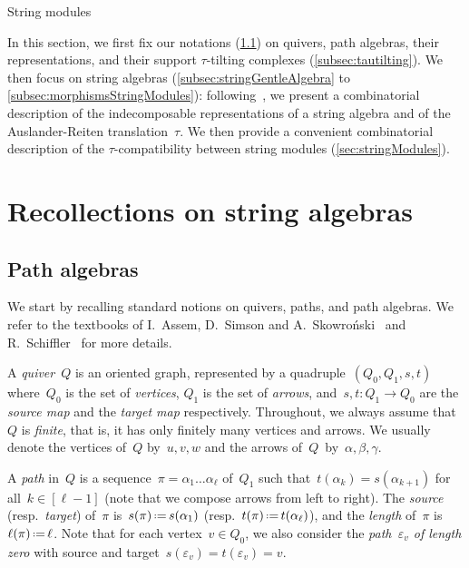 \documentclass{amsart}
\makeatletter
\theoremstyle{definition}
\newcommand{\eqdef}{\mbox{\,\raisebox{0.2ex}{\scriptsize\ensuremath{\mathrm:}}\ensuremath{=}\,}} %
\newcommand{\darkblue}{\color{darkblue}} %
\newcommand{\defn}[1]{\textsl{\darkblue #1}} %
\def\part{\@startsection{part}{1}%
\z@{.7\linespacing\@plus\linespacing}{.8\linespacing}%
{\LARGE\sffamily\centering}}
\makeatother
\begin{document}


\newpage
\part{String modules}
\label{part:algebra}

In this section, we first fix our notations (\ref{subsec:pathAlgebra}) on quivers, path algebras, their representations, and their support $\tau$-tilting complexes (\ref{subsec:tautilting}).
We then focus on string algebras (\ref{subsec:stringGentleAlgebra} to \ref{subsec:morphismsStringModules}): following~\cite{ButlerRingel}, we present a combinatorial description of the indecomposable representations of a string algebra and of the Auslander-Reiten translation~$\tau$.
We then provide a convenient combinatorial description of the $\tau$-compatibility between string modules (\ref{sec:stringModules}).

\section{Recollections on string algebras}
\label{sec:recollectionsStringAlgebras}

\subsection{Path algebras}
\label{subsec:pathAlgebra}

We start by recalling standard notions on quivers, paths, and path algebras.
We refer to the textbooks of I.~Assem, D.~Simson and A.~Skowro\'nski~\cite{AssemSimsonSkowronski} and R.~Schiffler~\cite{Schiffler} for more details.

A \defn{quiver}~$Q$ is an oriented graph, represented by a quadruple~$(Q_0, Q_1, s, t)$ where~$Q_0$ is the set of \defn{vertices}, $Q_1$ is the set of \defn{arrows}, and~$s, t : Q_1 \to Q_0$ are the \defn{source map} and the \defn{target map} respectively.
Throughout, we always assume that~$Q$ is \defn{finite}, that is, it has only finitely many vertices and arrows.
We usually denote the vertices of~$Q$ by~$u,v,w$ and the arrows of~$Q$~by~$\alpha, \beta, \gamma$.

A \defn{path} in~$Q$ is a sequence~$\pi = \alpha_1 \dots \alpha_\ell$ of~$Q_1$ such that~$t(\alpha_k) = s(\alpha_{k+1})$ for all~${k \in [\ell-1]}$ (note that we compose arrows from left to right).
The \defn{source} (resp.~\defn{target}) of~$\pi$ is~$s(\pi) \eqdef s(\alpha_1)$ (resp.~$t(\pi) \eqdef t(\alpha_\ell)$), and the \defn{length} of~$\pi$ is~$\ell(\pi) \eqdef \ell$.
Note that for each vertex~$v \in Q_0$, we also consider the \defn{path~$\varepsilon_v$ of length zero} with source and target~$s(\varepsilon_v) = t(\varepsilon_v) = v$.
\end{document}
